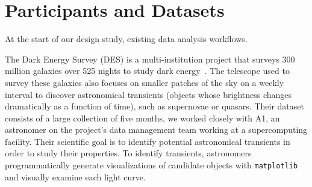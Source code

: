 \section{Participants and Datasets\label{sec:participantdatasets}}
 At the start of our design study,  existing data analysis workflows. 
\par\noindent{} The Dark Energy Survey (DES) is a multi-institution project that surveys 300 million galaxies over 525 nights to study dark energy~\cite{Drlica-Wagner2017}. The telescope used to survey these galaxies also focuses on smaller patches of the sky on a weekly interval to discover astronomical transients (objects whose brightness changes dramatically as a function of time), such as supernovae or quasars. Their dataset consists of a large collection of  five months, we worked closely with A1, an astronomer on the project's data management team working at a supercomputing facility. Their scientific goal is to identify potential astronomical transients in order to study their properties. 
\npar To identify transients, astronomers programmatically generate visualizations of candidate objects with \texttt{matplotlib} and visually examine each light curve. %

